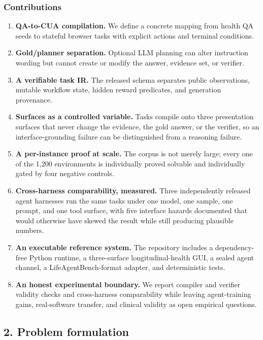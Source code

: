 \documentclass[
]{article}
\providecommand{\tightlist}{%
  \setlength{\itemsep}{0pt}\setlength{\parskip}{0pt}}
\begin{document}
\subsubsection{Contributions}\label{contributions}

\begin{enumerate}
\def\labelenumi{\arabic{enumi}.}
\tightlist
\item
  \textbf{QA-to-CUA compilation.} We define a concrete mapping from
  health QA seeds to stateful browser tasks with explicit actions and
  terminal conditions.
\item
  \textbf{Gold/planner separation.} Optional LLM planning can alter
  instruction wording but cannot create or modify the answer, evidence
  set, or verifier.
\item
  \textbf{A verifiable task IR.} The released schema separates public
  observations, mutable workflow state, hidden reward predicates, and
  generation provenance.
\item
  \textbf{Surfaces as a controlled variable.} Tasks compile onto three
  presentation surfaces that never change the evidence, the gold answer,
  or the verifier, so an interface-grounding failure can be
  distinguished from a reasoning failure.
\item
  \textbf{A per-instance proof at scale.} The corpus is not merely
  large; every one of the 1,200 environments is individually proved
  solvable and individually gated by four negative controls.
\item
  \textbf{Cross-harness comparability, measured.} Three independently
  released agent harnesses run the same tasks under one model, one
  sample, one prompt, and one tool surface, with five interface hazards
  documented that would otherwise have skewed the result while still
  producing plausible numbers.
\item
  \textbf{An executable reference system.} The repository includes a
  dependency-free Python runtime, a three-surface longitudinal-health
  GUI, a sealed agent channel, a LifeAgentBench-format adapter, and
  deterministic tests.
\item
  \textbf{An honest experimental boundary.} We report compiler and
  verifier validity checks and cross-harness comparability while leaving
  agent-training gains, real-software transfer, and clinical validity as
  open empirical questions.
\end{enumerate}

\subsection{2. Problem formulation}\label{problem-formulation}
\end{document}

